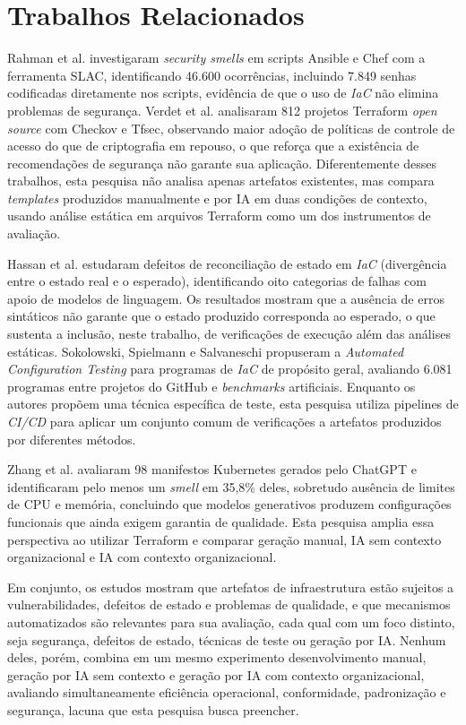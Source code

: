 \section{Trabalhos Relacionados}
\label{sec:trabalhos_relacionados}

Rahman et al. \cite{rahman2021securitysmells} investigaram \textit{security smells} em scripts Ansible e Chef com a ferramenta SLAC, identificando 46.600 ocorrências, incluindo 7.849 senhas codificadas diretamente nos scripts, evidência de que o uso de \textit{IaC} não elimina problemas de segurança. Verdet et al. \cite{verdet2025security} analisaram 812 projetos Terraform \textit{open source} com Checkov e Tfsec, observando maior adoção de políticas de controle de acesso do que de criptografia em repouso, o que reforça que a existência de recomendações de segurança não garante sua aplicação. Diferentemente desses trabalhos, esta pesquisa não analisa apenas artefatos existentes, mas compara \textit{templates} produzidos manualmente e por IA em duas condições de contexto, usando análise estática em arquivos Terraform como um dos instrumentos de avaliação.

Hassan et al. \cite{hassan2024state} estudaram defeitos de reconciliação de estado em \textit{IaC} (divergência entre o estado real e o esperado), identificando oito categorias de falhas com apoio de modelos de linguagem. Os resultados mostram que a ausência de erros sintáticos não garante que o estado produzido corresponda ao esperado, o que sustenta a inclusão, neste trabalho, de verificações de execução além das análises estáticas. Sokolowski, Spielmann e Salvaneschi \cite{sokolowski2024automated} propuseram a \textit{Automated Configuration Testing} para programas de \textit{IaC} de propósito geral, avaliando 6.081 programas entre projetos do GitHub e \textit{benchmarks} artificiais. Enquanto os autores propõem uma técnica específica de teste, esta pesquisa utiliza pipelines de \textit{CI/CD} para aplicar um conjunto comum de verificações a artefatos produzidos por diferentes métodos.

Zhang et al. \cite{zhang2024generative} avaliaram 98 manifestos Kubernetes gerados pelo ChatGPT e identificaram pelo menos um \textit{smell} em 35,8\% deles, sobretudo ausência de limites de CPU e memória, concluindo que modelos generativos produzem configurações funcionais que ainda exigem garantia de qualidade. Esta pesquisa amplia essa perspectiva ao utilizar Terraform e comparar geração manual, IA sem contexto organizacional e IA com contexto organizacional.

Em conjunto, os estudos mostram que artefatos de infraestrutura estão sujeitos a vulnerabilidades, defeitos de estado e problemas de qualidade, e que mecanismos automatizados são relevantes para sua avaliação, cada qual com um foco distinto, seja segurança, defeitos de estado, técnicas de teste ou geração por IA. Nenhum deles, porém, combina em um mesmo experimento desenvolvimento manual, geração por IA sem contexto e geração por IA com contexto organizacional, avaliando simultaneamente eficiência operacional, conformidade, padronização e segurança, lacuna que esta pesquisa busca preencher.
